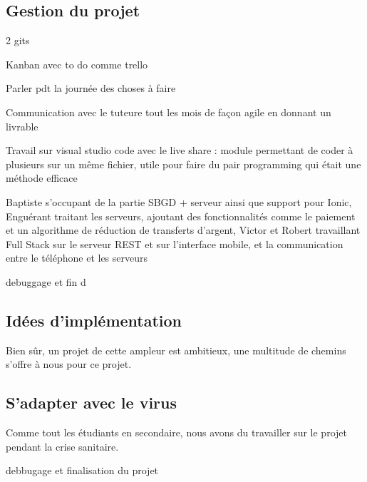 \subsection{Gestion du projet}
2 gits

Kanban avec to do comme trello

Parler pdt la journée des choses à faire

Communication avec le tuteure tout les mois de façon agile en donnant un livrable

Travail sur visual studio code avec le live share : module permettant de coder à plusieurs sur un même fichier, utile pour faire du pair programming qui était une méthode efficace

Baptiste s'occupant de la partie SBGD + serveur ainsi que support pour Ionic,
Enguérant traitant les serveurs, ajoutant des fonctionnalités comme le paiement et un algorithme de réduction de transferts d'argent,
Victor et Robert travaillant Full Stack sur le serveur REST et sur l'interface mobile, et la communication entre le téléphone et les serveurs

debuggage et fin d

\subsection{Idées d'implémentation}

Bien sûr, un projet de cette ampleur est ambitieux, une multitude de chemins s'offre à nous pour ce projet.

\subsection{S'adapter avec le virus}

Comme tout les étudiants en secondaire, nous avons du travailler sur le projet pendant la crise sanitaire. 

debbugage et finalisation du projet